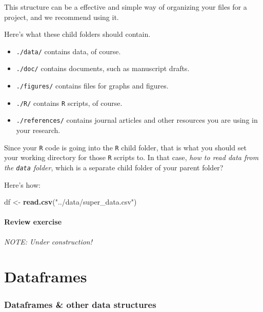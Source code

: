 \documentclass[
]{book}
\newenvironment{Shaded}{\begin{snugshade}}{\end{snugshade}}
\newcommand{\KeywordTok}[1]{\textcolor[rgb]{0.13,0.29,0.53}{\textbf{#1}}}
\newcommand{\NormalTok}[1]{#1}
\newcommand{\StringTok}[1]{\textcolor[rgb]{0.31,0.60,0.02}{#1}}
\providecommand{\tightlist}{%
  \setlength{\itemsep}{0pt}\setlength{\parskip}{0pt}}
\begin{document}
This structure can be a effective and simple way of organizing your files for a project, and we recommend using it.

Here's what these child folders should contain.

\begin{itemize}
\tightlist
\item
  \texttt{./data/} contains data, of course.
\item
  \texttt{./doc/} contains documents, such as manuscript drafts.
\item
  \texttt{./figures/} contains files for graphs and figures.
\item
  \texttt{./R/} contains \texttt{R} scripts, of course.
\item
  \texttt{./references/} contains journal articles and other resources you are using in your research.
\end{itemize}

Since your \texttt{R} code is going into the \texttt{R} child folder, that is what you should set your working directory for those \texttt{R} scripts to. In that case, \emph{how to read data from the \texttt{data} folder}, which is a separate child folder of your parent folder?

Here's how:

\begin{Shaded}
\begin{Highlighting}[]
\NormalTok{df <-}\StringTok{ }\KeywordTok{read.csv}\NormalTok{(}\StringTok{"../data/super_data.csv"}\NormalTok{)}
\end{Highlighting}
\end{Shaded}

\hypertarget{review-exercise}{%
\subsubsection*{Review exercise}\label{review-exercise}}

\emph{NOTE: Under construction!}

\hypertarget{dataframes}{%
\chapter{Dataframes}\label{dataframes}}

\hypertarget{dataframes-other-data-structures}{%
\subsection*{Dataframes \& other data structures}\label{dataframes-other-data-structures}}
\end{document}

